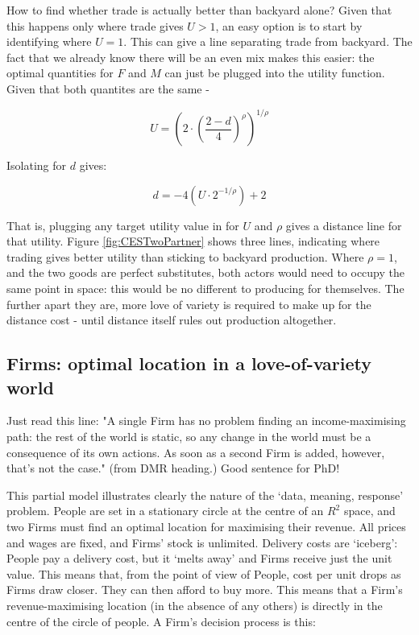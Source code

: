 How to find whether trade is actually better than backyard alone? Given that this happens only where trade gives $U>1$, an easy option is to start by identifying where $U=1$. This can give a line separating trade from backyard. The fact that we already know there will be an even mix makes this easier: the optimal quantities for $F$ and $M$ can just be plugged into the utility function. Given that both quantites are the same -

\begin{equation}
U = (2\cdot(\frac{2-d}{4})^\rho)^{1/\rho}
\end{equation}

Isolating for $d$ gives: 

\begin{equation}
d = -4(U\cdot2^{-1/\rho})+2
\end{equation}

That is, plugging any target utility value in for $U$ and $\rho$ gives a distance line for that utility. Figure \ref{fig:CESTwoPartner} shows three lines, indicating where trading gives better utility than sticking to backyard production. Where $\rho=1$, and the two goods are perfect substitutes, both actors would need to occupy the same point in space: this would be no different to producing for themselves. The further apart they are, more love of variety is required to make up for the distance cost - until distance itself rules out production altogether.


\subsection{Firms: optimal location in a love-of-variety world \label{sec:firmsLoV}}



Just read this line: "A single Firm has no problem finding an income-maximising path: the rest of the world is static, so any change in the world must be a consequence of its own actions. As soon as a second Firm is added, however, that's not the case." (from DMR heading.) Good sentence for PhD!

This partial model illustrates clearly the nature of the `data, meaning, response' problem. People are set in a stationary circle at the centre of an $R^2$ space, and two Firms must find an optimal location for maximising their revenue. All prices and wages are fixed, and Firms' stock is unlimited. Delivery costs are `iceberg': People pay a delivery cost, but it `melts away' and Firms receive just the unit value. This means that, from the point of view of People, cost per unit drops as Firms draw closer. They can then afford to buy more. This means that a Firm's revenue-maximising location (in the absence of any others) is directly in the centre of the circle of people. A Firm's decision process is this:

